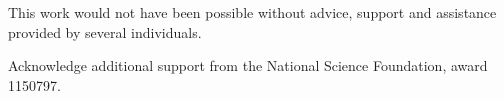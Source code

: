 



\begin{Acknowledgments}
\setlength{\baselineskip}{1.5\baselineskip}
{
This work would not have been possible without advice, support and assistance
provided by several individuals.

Acknowledge additional support from the National Science Foundation, award
1150797.
}
\end{Acknowledgments}
